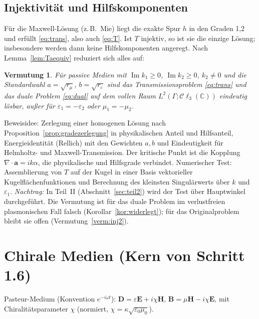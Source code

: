 \documentclass[11pt, a4paper]{article}
\newcommand{\mvec}[1]{\boldsymbol{#1}}
\newcommand{\clc}{\mathcal{C}\ell_{3}(\mathbb{C})}
\theoremstyle{plain}
\newtheorem{vermutung}[satz]{Vermutung}
\theoremstyle{definition}
\newcommand{\status}[1]{\hfill{\small\sffamily[#1]}}
\begin{document}
\subsection{Injektivität und Hilfskomponenten}\label{sec:injekt}

Für die Maxwell-Lösung (z.\,B.\ Mie) liegt die exakte Spur $h$ in den Graden 1,2
und erfüllt \eqref{eq:trans}, also auch \eqref{eq:T}. Ist $T$ injektiv, so ist sie
die einzige Lösung; insbesondere werden dann keine Hilfskomponenten angeregt.
Nach Lemma~\ref{lem:Taequiv} reduziert sich alles auf:

\begin{vermutung}\label{verm:inj}\status{Vermutung}
Für passive Medien mit $\operatorname{Im}k_1\ge0$, $\operatorname{Im}k_2\ge0$,
$k_2\neq0$ und die Standardwahl $a=\sqrt{r_\mu}$, $b=\sqrt{r_\varepsilon}$ sind das
Transmissionsproblem \eqref{eq:trans} und das duale Problem \eqref{eq:dual}
auf dem \emph{vollen} Raum $L^2(\Gamma;\clc)$ eindeutig lösbar, außer für
$\varepsilon_1=-\varepsilon_2$ oder $\mu_1=-\mu_2$.
\end{vermutung}

Beweisidee: Zerlegung einer homogenen Lösung nach Proposition~\ref{prop:gradezerlegung}
in physikalischen Anteil und Hilfsanteil, Energieidentität (Rellich) mit den
Gewichten $a,b$ und Eindeutigkeit für Helmholtz- und Maxwell-Transmission. Der
kritische Punkt ist die Kopplung $\nabla\cdot\mvec{a}=ik\alpha$, die physikalische
und Hilfsgrade verbindet. Numerischer Test: Assemblierung von $T$ auf der Kugel
in einer Basis vektorieller Kugelflächenfunktionen und Berechnung des kleinsten
Singulärwerts über $k$ und $\varepsilon_1$. \emph{Nachtrag:} In Teil~II
(Abschnitt~\ref{sec:teil2}) wird der Test über Hauptwinkel durchgeführt. Die Vermutung ist für
das duale Problem im verlustfreien plasmonischen Fall falsch
(Korollar~\ref{kor:widerlegt}); für das Originalproblem bleibt sie offen
(Vermutung~\ref{verm:inj2}).

\section{Chirale Medien (Kern von Schritt 1.6)}

Pasteur-Medium (Konvention $e^{-i\omega t}$):
$\mvec{D} = \varepsilon\mvec{E} + i\chi\mvec{H}$, $\mvec{B} = \mu\mvec{H}-i\chi\mvec{E}$,
mit Chiralitätsparameter $\chi$ (normiert, $\chi = \kappa\sqrt{\varepsilon_0\mu_0}$).
\end{document}
